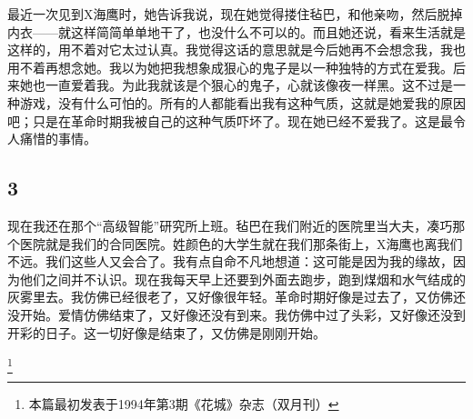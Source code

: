 最近一次见到X海鹰时，她告诉我说，现在她觉得搂住毡巴，和他亲吻，然后脱掉内衣——就这样简简单单地干了，也没什么不可以的。而且她还说，看来生活就是这样的，用不着对它太过认真。我觉得这话的意思就是今后她再不会想念我，我也用不着再想念她。我以为她把我想象成狠心的鬼子是以一种独特的方式在爱我。后来她也一直爱着我。为此我就该是个狠心的鬼子，心就该像夜一样黑。这不过是一种游戏，没有什么可怕的。所有的人都能看出我有这种气质，这就是她爱我的原因吧；只是在革命时期我被自己的这种气质吓坏了。现在她已经不爱我了。这是最令人痛惜的事情。 

\subsection{3}

 现在我还在那个“高级智能”研究所上班。毡巴在我们附近的医院里当大夫，凑巧那个医院就是我们的合同医院。姓颜色的大学生就在我们那条街上，X海鹰也离我们不远。我们这些人又会合了。我有点自命不凡地想道：这可能是因为我的缘故，因为他们之间并不认识。现在我每天早上还要到外面去跑步，跑到煤烟和水气结成的灰雾里去。我仿佛已经很老了，又好像很年轻。革命时期好像是过去了，又仿佛还没开始。爱情仿佛结束了，又好像还没有到来。我仿佛中过了头彩，又好像还没到开彩的日子。这一切好像是结束了，又仿佛是刚刚开始。

\footnote{本篇最初发表于1994年第3期《花城》杂志（双月刊）}
